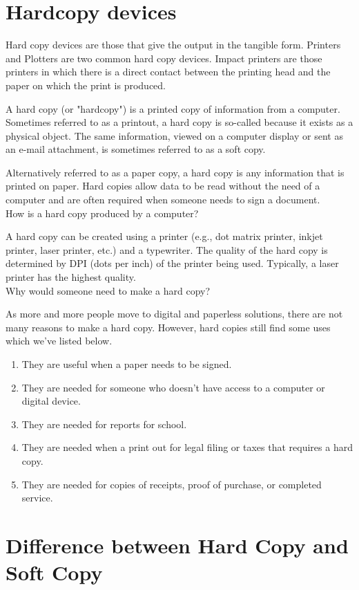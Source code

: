 \documentclass[11pt,a4paper,twoside]{article}
\begin{document}
\section{Hardcopy devices}
Hard copy devices are those that give the output in the tangible form. Printers and Plotters are two common hard copy devices. Impact printers are those printers in which there is a direct contact between the printing head and the paper on which the print is produced.\par
A hard copy (or "hardcopy") is a printed copy of information from a computer. Sometimes referred to as a printout, a hard copy is so-called because it exists as a physical object. The same information, viewed on a computer display or sent as an e-mail attachment, is sometimes referred to as a soft copy.\par 
Alternatively referred to as a paper copy, a hard copy is any information that is printed on paper. Hard copies allow data to be read without the need of a computer and are often required when someone needs to sign a document.\\
How is a hard copy produced by a computer?\par
A hard copy can be created using a printer (e.g., dot matrix printer, inkjet printer, laser printer, etc.) and a typewriter.
The quality of the hard copy is determined by DPI (dots per inch) of the printer being used. Typically, a laser printer has the highest quality.\\
Why would someone need to make a hard copy?\par
As more and more people move to digital and paperless solutions, there are not many reasons to make a hard copy. However, hard copies still find some uses which we've listed below.
\begin{enumerate}
    \item They are useful when a paper needs to be signed.
\item They are needed for someone who doesn't have access to a computer or digital device.
\item They are needed for reports for school.
\item They are needed when a print out for legal filing or taxes that requires a hard copy.
\item They are needed for copies of receipts, proof of purchase, or completed service.
\end{enumerate}
\section{Difference between Hard Copy and Soft Copy}
\end{document}
